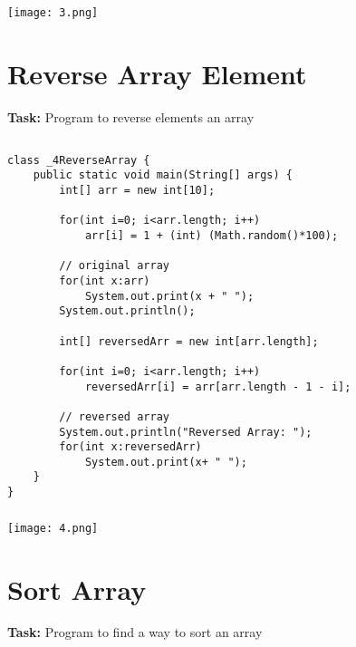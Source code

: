 \documentclass[12pt,a4paper]{article}
\begin{document}
\subsubsection{}
\begin{center}
    \texttt{[image: 3.png]}
\end{center}


\section{Reverse Array Element}
\textbf{Task:} Program to reverse elements an array

\subsection{}
\begin{lstlisting}
class _4ReverseArray {
    public static void main(String[] args) {
        int[] arr = new int[10];
    
        for(int i=0; i<arr.length; i++)
            arr[i] = 1 + (int) (Math.random()*100);
    
        // original array
        for(int x:arr)
            System.out.print(x + " ");
        System.out.println();
    
        int[] reversedArr = new int[arr.length];
    
        for(int i=0; i<arr.length; i++)
            reversedArr[i] = arr[arr.length - 1 - i];
    
        // reversed array
        System.out.println("Reversed Array: ");
        for(int x:reversedArr)
            System.out.print(x+ " ");
    }
}
\end{lstlisting}

\subsubsection{}
\begin{center}
    \texttt{[image: 4.png]}
\end{center}

\section{Sort Array}
\textbf{Task:} Program to find a way to sort an array

\end{document}
